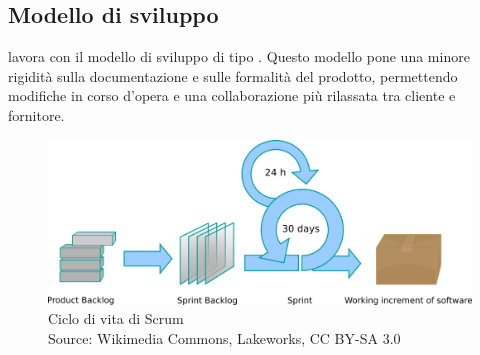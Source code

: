    \subsection{Modello di sviluppo}
   \nomeAzienda{} lavora con il modello di sviluppo  di tipo . Questo modello pone una minore rigidità sulla documentazione e sulle formalità del prodotto, permettendo modifiche in corso d'opera e una collaborazione più rilassata tra cliente e fornitore.

   \begin{figure}[htbp]
      \centering
      \includegraphics[width=14cm]{immagini/scrum-process}
      \caption[Ciclo di vita di Scrum]{Ciclo di vita di Scrum
      \\
      Source: Wikimedia Commons, Lakeworks, CC BY-SA 3.0}
   \end{figure}

